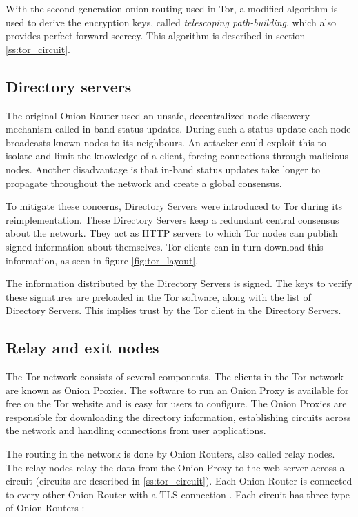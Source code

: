 \documentclass{article}
\begin{document}
		With the second generation onion routing used in Tor, a modified algorithm is used to derive the encryption keys, called \emph{telescoping path-building}, which also provides perfect forward secrecy. This algorithm is described in section \ref{ss:tor_circuit}.
		
	\subsection{Directory servers}
		The original Onion Router used an unsafe, decentralized node discovery mechanism called in-band status updates. During such a status update each node broadcasts known nodes to its neighbours. An attacker could exploit this to isolate and limit the knowledge of a client, forcing connections through malicious nodes. Another disadvantage is that in-band status updates take longer to propagate throughout the network and create a global consensus.
					
		To mitigate these concerns, Directory Servers were introduced to Tor during its reimplementation. These Directory Servers keep a redundant central consensus about the network. They act as HTTP servers to which Tor nodes can publish signed information about themselves. Tor clients can in turn download this information, as seen in figure \ref{fig:tor_layout}.
					
		The information distributed by the Directory Servers is signed. The keys to verify these signatures are preloaded in the Tor software, along with the list of Directory Servers. This implies trust by the Tor client in the Directory Servers.

	\subsection{Relay and exit nodes}
		The Tor network consists of several components. The clients in the Tor network are known as Onion Proxies. The software to run an Onion Proxy is available for free on the Tor website \cite{torprojectwebsite} and is easy for users to configure. The Onion Proxies are responsible for downloading the directory information, establishing circuits across the network and handling connections from user applications.
		
		The routing in the network is done by Onion Routers, also called relay nodes. The relay nodes relay the data from the Onion Proxy to the web server across a circuit (circuits are described in \ref{ss:tor_circuit}). Each Onion Router is connected to every other Onion Router with a TLS connection \cite{tlsprotocol}. Each circuit has three type of Onion Routers \cite{mccoy2008shining}:
		
\end{document}
